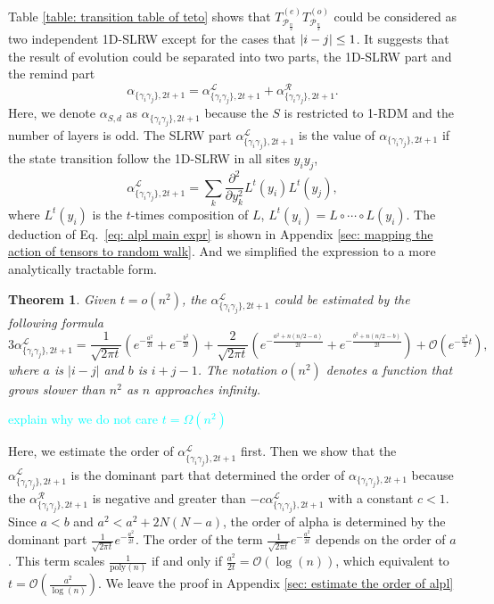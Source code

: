 \documentclass{article}
\newtheorem{theorem}{Theorem}
\newcommand{\Tcouple}{T^{(e)}_{\mathcal{P}_\frac{n}{2}} T^{(o)}_{\mathcal{P}_\frac{n}{2}}}
\newcommand{\alpl}{\alpha_{\{\gamma_i\gamma_j\}, 2t+1}^{\mathscr{L}}}
\newcommand{\alpr}{\alpha_{\{\gamma_i\gamma_j\}, 2t+1}^{\mathscr{R}}}
\begin{document}
Table \ref{table: transition table of teto} shows that $\Tcouple$ could be considered as two independent 1D-SLRW except for the cases that $\abs{i-j}\leq 1$. It suggests that the result of evolution could be separated into two parts, the 1D-SLRW part and the remind part
\begin{equation}
    \alpha_{\{\gamma_i \gamma_j\}, 2t+1} = \alpl + \alpr.
\end{equation}
Here, we denote $\alpha_{S, d}$ as $\alpha_{\{\gamma_i \gamma_j\}, 2t+1}$ because the $S$ is restricted to 1-RDM and the number of layers is odd. The SLRW part $\alpl$ is the value of $\alpha_{\{\gamma_i \gamma_j\}, 2t+1}$ if the state transition follow the 1D-SLRW in all sites $y_i y_j$,
\begin{equation}
\label{eq: alpl main expr}
    \alpl = \sum_k \frac{\partial^2}{\partial y_k^2} L^t(y_i)L^t(y_j),
\end{equation}
where $L^t(y_i)$ is the $t$-times composition of $L$, $L^t(y_i) = L\circ \cdots \circ L (y_i)$. The deduction of Eq.~\ref{eq: alpl main expr} is shown in Appendix \ref{sec: mapping the action of tensors to random walk}. And we simplified the expression to a more analytically tractable form. 
\begin{theorem}
    \label{theorem: order of alpha l}
    Given $t = o(n^2) $, the $\alpl$ could be estimated by the following formula
    \begin{equation}
        3\alpl = \frac{1}{\sqrt{2\pi t}} (e^{-\frac{a^2}{2t}}+ e^{-\frac{b^2}{2t}}) + \frac{2}{\sqrt{2\pi t}}(e^{-\frac{a^2+n(n/2-a)}{2t}}+ e^{-\frac{b^2+n(n/2-b)}{2t}}) + \mathcal{O}\left(e^{-\frac{\pi^2}{2}t}\right),
    \end{equation}
    where $a$ is $|i-j|$ and $b$ is $i+j-1$. The notation $o(n^2)$ denotes a function that grows slower than $n^2$ as $n$ approaches infinity. 
\end{theorem}
\textcolor{cyan}{explain why we do not care $t=\Omega(n^2)$}

Here, we estimate the order of $\alpl$ first. Then we show that the $\alpl$ is 
the dominant part that determined the order of $\alpha_{\{\gamma_i \gamma_j\}, 2t+1}$ because the $\alpr$ is negative and greater than $-c \alpl$ with a constant $c<1$. 
Since $a<b$ and $a^2 < a^2+2N(N-a)$, the order of alpha is determined by the dominant part $ \frac{1}{\sqrt{2\pi t}} e^{-\frac{a^2}{2t}}$. The order of the term $ \frac{1}{\sqrt{2\pi t}} e^{-\frac{a^2}{2t}}$ depends on the order of $a$. This term scales $\frac{1}{\mathrm{poly}(n)}$ if and only if $\frac{a^2}{2t} = \mathcal{O}(\log(n))$, which equivalent to $t = \mathcal{O}(\frac{a^2}{\log(n)})$. We leave the proof in Appendix \ref{sec: estimate the order of alpl}
\end{document}
